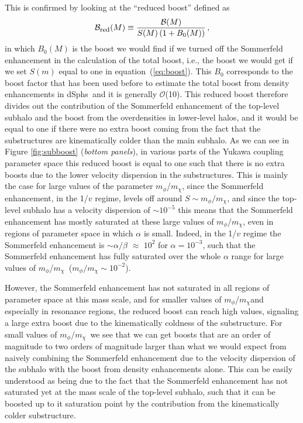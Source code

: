 \documentclass[aps,prd,twocolumn,amsmath,amssymb,floatfix,nofootinbib,10pt]{revtex4}
\newcommand{\ie}{i.e.}
\newcommand{\somm}{\ensuremath{S}}
\newcommand{\mdm}{\ensuremath{m_{\chi}}}
\newcommand{\mv}{\ensuremath{m_{\phi}}}
\newcommand{\eqnname}{equation}
\newcommand{\order}{\ensuremath{\mathcal{O}}}
\newcommand{\boost}{\ensuremath{B}}
\newcommand{\redboost}{\ensuremath{\mathcal{B}_{\mbox{{\footnotesize red}}}}}
\newcommand{\totalboost}{\ensuremath{\mathcal{B}}}
\newcommand{\dSphs}{dSphs}
\begin{document}
This is confirmed by looking at the ``reduced boost'' defined as
\begin{equation}\label{eq:redboost}
\redboost(M) \equiv \frac{\totalboost(M)}{\somm(M)\left(1+\boost_0(M)\right)}\, ,
\end{equation}
in which $\boost_0(M)$ is the boost we would find if we turned off the
Sommerfeld enhancement in the calculation of the total boost, \ie, the
boost we would get if we set $\somm(m)$ equal to one in \eqnname\
(\ref{eq:boost}). This $\boost_0$ corresponds to the boost factor that
has been used before to estimate the total boost from density
enhancements in \dSphs\ and it is generally \order(10). This reduced
boost therefore divides out the contribution of the Sommerfeld
enhancement of the top-level subhalo and the boost from the
overdensities in lower-level halos, and it would be equal to one if
there were no extra boost coming from the fact that the substructures
are kinematically colder than the main subhalo. As we can see in
Figure \ref{fig:subboost} (\emph{bottom panels}), in various parts of
the Yukawa coupling parameter space this reduced boost is equal to one
such that there is no extra boosts due to the lower velocity
dispersion in the substructures. This is mainly the case for large
values of the parameter \mv/\mdm, since the Sommerfeld enhancement, in
the 1/$v$ regime, levels off around $\somm \sim \mv/\mdm$, and since
the top-level subhalo has a velocity dispersion of $\sim 10^{-5}$ this
means that the Sommerfeld enhancement has mostly saturated at these
large values of \mv/\mdm, even in regions of parameter space in which
$\alpha$ is small. Indeed, in the 1/$v$ regime the Sommerfeld
enhancement is $\sim \alpha/\beta$ $\approx$ $10^{2}$ for $\alpha =
10^{-3}$, such that the Sommerfeld enhancement has fully saturated
over the whole $\alpha$ range for large values of \mv/\mdm\ ($\mv/\mdm
\sim 10^{-2}$).


However, the Sommerfeld enhancement has not saturated in all regions
of parameter space at this mass scale, and for smaller values of
\mv/\mdm and especially in resonance regions, the reduced boost can
reach high values, signaling a large extra boost due to the
kinematically coldness of the substructure.  For small values of
\mv/\mdm\ we see that we can get boosts that are an order of magnitude
to two orders of magnitude larger than what we would expect from
naively combining the Sommerfeld enhancement due to the velocity
dispersion of the subhalo with the boost from density enhancements
alone. This can be easily understood as being due to the fact that the
Sommerfeld enhancement has not saturated yet at the mass scale of the
top-level subhalo, such that it can be boosted up to it saturation
point by the contribution from the kinematically colder substructure. 
\end{document}
